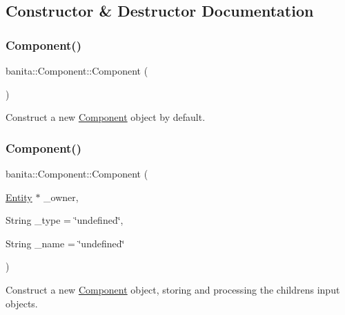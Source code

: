 \subsection{Constructor \& Destructor Documentation}
\mbox{\label{classbanita_1_1_component_ad73a6ae8fbf56b7d54ef48c5e9ec164d}} 
\subsubsection{\texorpdfstring{Component()}{Component()}\hspace{0.1cm}{\footnotesize\ttfamily [1/2]}}
{\footnotesize\ttfamily banita\+::\+Component\+::\+Component (\begin{DoxyParamCaption}{ }\end{DoxyParamCaption})}



Construct a new \mbox{\hyperlink{classbanita_1_1_component}{Component}} object by default. 

\mbox{\label{classbanita_1_1_component_a3a267ceeceda4ed4f9c7dba7d11f4886}} 
\subsubsection{\texorpdfstring{Component()}{Component()}\hspace{0.1cm}{\footnotesize\ttfamily [2/2]}}
{\footnotesize\ttfamily banita\+::\+Component\+::\+Component (\begin{DoxyParamCaption}\item[{\mbox{\hyperlink{classbanita_1_1_entity}{Entity}} $\ast$}]{\+\_\+owner,  }\item[{String}]{\+\_\+type = {\ttfamily \char`\"{}undefined\char`\"{}},  }\item[{String}]{\+\_\+name = {\ttfamily \char`\"{}undefined\char`\"{}} }\end{DoxyParamCaption})}



Construct a new \mbox{\hyperlink{classbanita_1_1_component}{Component}} object, storing and processing the children\textquotesingle{}s input objects. 

